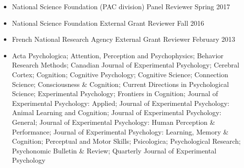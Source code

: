 \documentclass[11pt,a4paper,]{moderncv}
\providecommand{\tightlist}{%
	\setlength{\itemsep}{0pt}\setlength{\parskip}{0pt}}
\begin{document}
\begin{itemize}
\tightlist
\item
  National Science Foundation (PAC division) Panel Reviewer Spring 2017
\item
  National Science Foundation External Grant Reviewer Fall 2016
\item
  French National Research Agency External Grant Reviewer February 2013
\item
  Acta Psychologica; Attention, Perception and Psychophysics; Behavior Research Methods; Canadian Journal of Experimental Psychology; Cerebral Cortex; Cognition; Cognitive Psychology; Cognitive Science; Connection Science; Consciousness \& Cognition; Current Directions in Psychological Science; Experimental Psychology; Frontiers in Cognition; Journal of Experimental Psychology: Applied; Journal of Experimental Psychology: Animal Learning and Cognition; Journal of Experimental Psychology: General; Journal of Experimental Psychology: Human Perception \& Performance; Journal of Experimental Psychology: Learning, Memory \& Cognition; Perceptual and Motor Skills; Psicologica; Psychological Research; Psychonomic Bulletin \& Review; Quarterly Journal of Experimental Psychology
\end{itemize}
\end{document}
